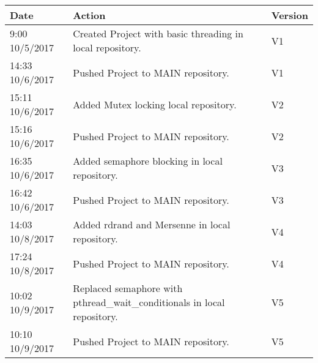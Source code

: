 \documentclass[letterpaper,10pt,fleqn]{article}
\begin{document}
		
\begin{table}[h]
  \begin{tabular}{|l|l|l|}
  \hline
  Date & Action & Version \\ \hline
 9:00 10/5/2017 & Created Project with basic threading in local repository. & V1 \\ 
 14:33 10/6/2017 & Pushed Project to MAIN repository. & V1 \\ 
 15:11 10/6/2017 & Added Mutex locking local repository. & V2 \\ 
 15:16 10/6/2017 & Pushed Project to MAIN repository. & V2 \\ 
 16:35 10/6/2017 & Added semaphore blocking in local repository. & V3 \\ 
 16:42 10/6/2017 & Pushed Project to MAIN repository. & V3 \\ 
 14:03 10/8/2017 & Added rdrand and Mersenne in local repository. & V4 \\ 
 17:24 10/8/2017 & Pushed Project to MAIN repository. & V4 \\ 
 10:02 10/9/2017 & Replaced semaphore with pthread\_wait\_conditionals in local repository. & V5 \\ 
 10:10 10/9/2017 & Pushed Project to MAIN repository. & V5 \\
  \hline
  \end{tabular}
  \end{table}
\end{document}
